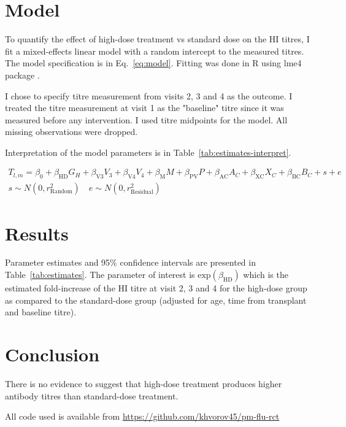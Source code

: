 \documentclass[11pt]{article}
\begin{document}
\section{Model}

To quantify the effect of high-dose treatment vs standard dose on the
HI titres, I fit a mixed-effects linear model with a random intercept
to the measured titres.
The model specification is in Eq.~\ref{eq:model}.
Fitting was done in R \cite{R} using lme4 package \cite{lme4}.

I chose to specify titre measurement from visits 2, 3 and 4 as the outcome.
I treated the titre measurement at visit 1 as the "baseline" titre since
it was measured before any intervention. I used titre midpoints for the model.
All missing observations were dropped.

Interpretation of the model parameters is in
Table~\ref{tab:estimates-interpret}.

\begin{equation}
    \begin{gathered}
        \label{eq:model}
        T_{l,m} = \beta_0 + \beta_{\text{HD}}G_H + \beta_{\text{V3}}V_3
        + \beta_{\text{V4}}V_4 + \beta_{\text{M}}M + \beta_{\text{PV}}P
        + \beta_{\text{AC}}A_C
        + \beta_{\text{XC}}X_C + \beta_{\text{BC}}B_C
        + s + e\\
        s \sim N(0, r^2_{\text{Random}}) \quad e \sim N(0, r^2_{\text{Residual}})
    \end{gathered}
\end{equation}





\section{Results}

Parameter estimates and 95\% confidence intervals
are presented in Table~\ref{tab:estimates}.
The parameter of interest is $\text{exp}(\beta_{\text{HD}})$
which is the estimated
fold-increase of the HI titre at visit 2, 3 and 4 for the high-dose group
as compared to the standard-dose group (adjusted for age, time from transplant
and baseline titre).



\section{Conclusion}

There is no evidence to suggest that high-dose treatment produces
higher antibody
titres than standard-dose treatment.



All code used is available from \url{https://github.com/khvorov45/pm-flu-rct}
\end{document}
